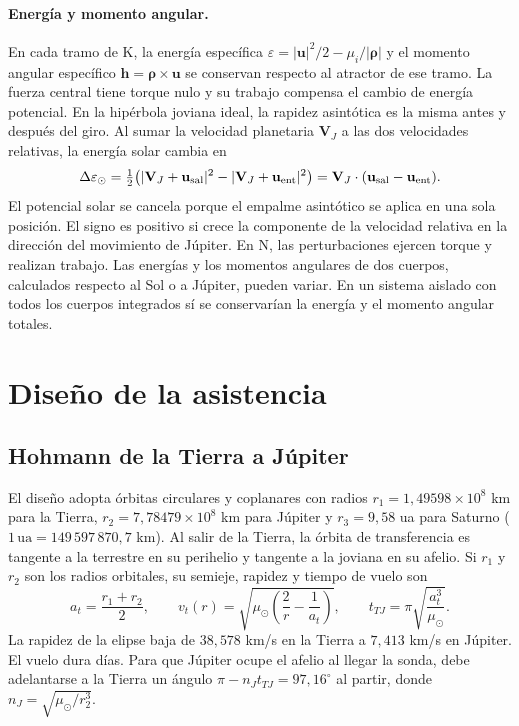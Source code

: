 \documentclass[11pt,letterpaper]{article}
\newcommand{\vect}[1]{\mathbf{#1}}
\begin{document}
\paragraph{Energía y momento angular.}
En cada tramo de K, la energía específica $\varepsilon=|\vect u|^2/2-\mu_i/|\vect\rho|$ y el momento angular específico $\vect h=\vect\rho\times\vect u$ se conservan respecto al atractor de ese tramo. La fuerza central tiene torque nulo y su trabajo compensa el cambio de energía potencial. En la hipérbola joviana ideal, la rapidez asintótica es la misma antes y después del giro. Al sumar la velocidad planetaria $\vect V_J$ a las dos velocidades relativas, la energía solar cambia en
\begin{equation}
\Delta\varepsilon_\odot
=\tfrac12\bigl(|\vect V_J+\vect u_{\rm sal}|^2-
|\vect V_J+\vect u_{\rm ent}|^2\bigr)
=\vect V_J\cdot(\vect u_{\rm sal}-\vect u_{\rm ent}).
\end{equation}
El potencial solar se cancela porque el empalme asintótico se aplica en una sola posición. El signo es positivo si crece la componente de la velocidad relativa en la dirección del movimiento de Júpiter. En N, las perturbaciones ejercen torque y realizan trabajo. Las energías y los momentos angulares de dos cuerpos, calculados respecto al Sol o a Júpiter, pueden variar. En un sistema aislado con todos los cuerpos integrados sí se conservarían la energía y el momento angular totales.

\section{Diseño de la asistencia}
\subsection{Hohmann de la Tierra a Júpiter}
El diseño adopta órbitas circulares y coplanares con radios $r_1=1{,}49598\times10^8$ km para la Tierra, $r_2=7{,}78479\times10^8$ km para Júpiter y $r_3=9{,}58$ ua para Saturno ($1\,\mathrm{ua}=149\,597\,870{,}7$ km). Al salir de la Tierra, la órbita de transferencia es tangente a la terrestre en su perihelio y tangente a la joviana en su afelio. Si $r_1$ y $r_2$ son los radios orbitales, su semieje, rapidez y tiempo de vuelo son
\[
a_t=\frac{r_1+r_2}{2},\qquad
v_t(r)=\sqrt{\mu_\odot\left(\frac{2}{r}-\frac{1}{a_t}\right)},\qquad
t_{TJ}=\pi\sqrt{\frac{a_t^3}{\mu_\odot}}.
\]
La rapidez de la elipse baja de $38{,}578$ km/s en la Tierra a $7{,}413$ km/s en Júpiter. El vuelo dura \DiasHohmann{} días. Para que Júpiter ocupe el afelio al llegar la sonda, debe adelantarse a la Tierra un ángulo $\pi-n_Jt_{TJ}=97{,}16^\circ$ al partir, donde $n_J=\sqrt{\mu_\odot/r_2^3}$.
\end{document}
